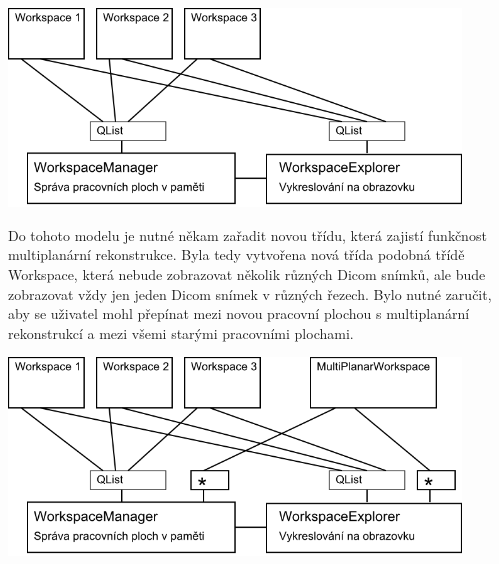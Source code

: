 \includegraphics[width=0.9\textwidth]{Text/IMG/WorkspaceManager.png}

Do tohoto modelu je nutné někam zařadit novou třídu, která zajistí funkčnost multiplanární rekonstrukce. Byla tedy vytvořena nová třída podobná třídě Workspace, která nebude zobrazovat několik různých Dicom snímků, ale bude zobrazovat vždy jen jeden Dicom snímek v různých řezech. Bylo nutné zaručit, aby se uživatel mohl přepínat mezi novou pracovní plochou s multiplanární rekonstrukcí a mezi všemi starými pracovními plochami.

\includegraphics[width=0.9\textwidth]{Text/IMG/MultiPlanar.png}



